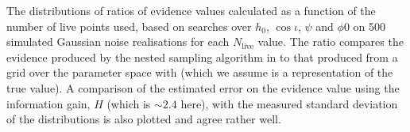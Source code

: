 \label{fig:nest_evs}
The distributions of ratios of evidence values calculated as a function of the number of live points used, based on searches over $h_0$, $\cos{\iota}$,
$\psi$ and $\phi0$ on 500 simulated Gaussian noise realisations for each $N_{\text{live}}$ value. The ratio compares the evidence produced by the
nested sampling algorithm in \lppen to that produced from a grid over the parameter space with \lppe (which we assume is a representation of the
true value). A comparison of the estimated error on the evidence value using the information gain, $H$ (which is $\sim 2.4$ here), with the measured
standard deviation of the distributions is also plotted and agree rather well.
